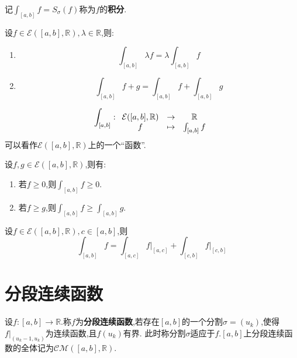 \begin{deff}
    记$\int_{[a,b]}f=S_\sigma(f)$称为$f$的\textbf{积分}.
\end{deff}

\begin{prop}
    设$f\in\mathcal{E}([a,b],\mathbb{R}),\lambda\in\mathbb{R}$,则:
    \begin{enumerate}
        \item \[ \int_{[a,b]}\lambda f=\lambda\int_{[a,b]}f \]
        \item \[ \int_{[a,b]}f+g=\int_{[a,b]}f+\int_{[a,b]}g \]
    \end{enumerate}
\end{prop}

\begin{rqq}
    \[ \int_{[a,b]}:\begin{array}[t]{ccc}\mathcal{E}([a,b],\mathbb{R}) & \to &\mathbb{R} \\ f & \mapsto & \int_{[a,b]}f \end{array} \]
    可以看作$\mathcal{E}([a,b],\mathbb{R})$上的一个``函数''.
\end{rqq}

\begin{prop}
    设$f,g\in\mathcal{E}([a,b],\mathbb{R})$,则有:
    \begin{enumerate}
        \item 若$f\geqslant0$,则$\int_{[a,b]}f\geqslant0$.
        \item 若$f \geqslant g$,则$\int_{[a,b]}f \geqslant \int_{[a,b]}g$.
    \end{enumerate}
\end{prop}

\begin{prop}
    设$f\in\mathcal{E}([a,b],\mathbb{R}),c\in[a,b]$,则
    \[ \int_{[a,b]}f=\int_{[a,c]}f\vert_{[a,c]}+\int_{[c,b]}f\vert_{[c,b]} \]
\end{prop}

\section{分段连续函数}

\begin{deff}
    设$f:[a,b]\to\mathbb{R}$.称$f$为\textbf{分段连续函数},若存在$[a,b]$的一个分割$\sigma=(u_k)$,使得$f\vert_{(u_k-1,u_k)}$为连续函数,且$f(u_k)$有界.
    此时称分割$\sigma$适应于$f$.$[a,b]$上分段连续函数的全体记为$\mathcal{CM}([a,b],\mathbb{R})$.
\end{deff}

